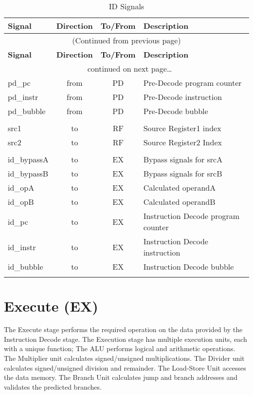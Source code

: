 \begin{longtable}[]{@{}lccl@{}}
	\toprule
	\textbf{Signal} & \textbf{Direction} & \textbf{To/From} & \textbf{Description}\tabularnewline
	\midrule
	\endfirsthead
	\multicolumn{4}{c}{{(Continued from previous page)}} \\
	\toprule
	\textbf{Signal} & \textbf{Direction} & \textbf{To/From} & \textbf{Description}\tabularnewline
	\midrule
	\endhead
	\midrule \multicolumn{4}{c}{{\tablename\ \thetable{} continued on next page\ldots}} \\
	\endfoot
	\endlastfoot
	
		pd\_pc	    & from & PD & Pre-Decode program counter\\
		pd\_instr   & from & PD & Pre-Decode instruction\\
		pd\_bubble  & from & PD & Pre-Decode bubble\\
		\\
		src1        & to   & RF & Source Register1 index\\
		src2        & to   & RF & Source Register2 Index\\
		\\			
		id\_bypassA & to   & EX & Bypass signals for srcA\\
		id\_bypassB & to   & EX & Bypass signals for srcB\\
		id\_opA     & to   & EX & Calculated operandA\\
		id\_opB     & to   & EX & Calculated operandB\\
		id\_pc      & to   & EX & Instruction Decode program counter\\
		id\_instr   & to   & EX & Instruction Decode instruction\\
		id\_bubble  & to   & EX & Instruction Decode bubble\\	
	\bottomrule
	\caption{ID Signals}
	\label{tab:id-signals}
\end{longtable}

\pagebreak

\section{Execute (EX)}\label{execute-ex-1}

The Execute stage performs the required operation on the data provided by the Instruction Decode stage. The Execution stage has multiple execution units, each with a unique function;
The ALU performs logical and arithmetic operations.
The Multiplier unit calculates signed/unsigned multiplications.
The Divider unit calculates signed/unsigned division and remainder.
The Load-Store Unit accesses the data memory.
The Branch Unit calculates jump and branch addresses and validates the predicted branches.

